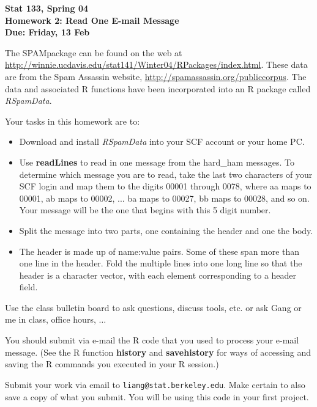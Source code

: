 \documentclass[12pt]{article}
\makeatletter
\def\SPAM{SPAM}
\def\TA{Gang}
\def\TAMail{\texttt{liang@stat.berkeley.edu}}
\def\SFunctionRef#1{\textbf{#1}}
\def\Rpackage#1{\textit{#1}}
\makeatother
\begin{document}
\noindent
\textbf{Stat 133, Spring 04 \\
Homework 2: Read One E-mail Message\\
Due:  Friday, 13 Feb}

\medskip

The \SPAM package can be found on the web at 
\url{http://winnie.ucdavis.edu/stat141/Winter04/RPackages/index.html}.
These data are from the Spam Assassin website,
\url{http://spamassassin.org/publiccorpus}.
The data and associated R functions have been incorporated into an R package
called \Rpackage{RSpamData}.

\medskip

Your tasks in this homework are to:
\begin{itemize}
\item  Download and install \Rpackage{RSpamData} into your SCF account or your home PC.

\item Use \SFunctionRef{readLines} to read in one message from the hard\_ham messages.
To determine which message you are to read, take the last two characters of your SCF login
and map them to the digits 00001 through 0078, where aa maps to 00001, ab maps to 00002,
... ba maps to 00027, bb maps to 00028, and so on. 
Your message will be the one that begins with this 5 digit number.

\item Split the message into two parts, one containing the header and one the body.

\item The header is made up of name:value pairs. Some of these span more than one line
in the header. 
Fold the multiple lines into one long line so that the header is a character vector, 
with each element corresponding to a header field.


\end{itemize}

Use the class bulletin board to ask questions, discuss
tools, etc. or ask \TA{} or me in class, office hours, $\ldots$

You should submit via e-mail 
the R code that you used to process your e-mail message.
(See the R function \SFunctionRef{history} and \SFunctionRef{savehistory} 
for ways of accessing and saving the R commands you executed in your R session.)

Submit your work via email to \TAMail{}.
Make certain to also save a copy of what you submit.
You will be using this code in your first project.
\end{document}
